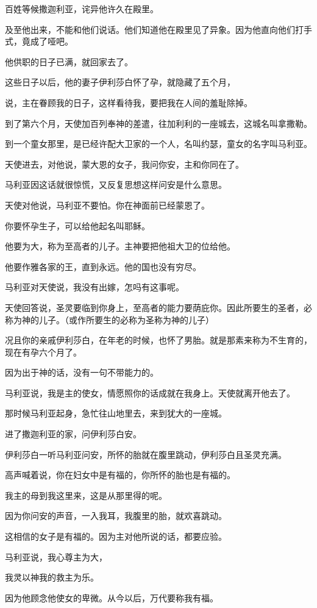 \documentclass[12pt,oneside]{book}
\begin{document}
百姓等候撒迦利亚，诧异他许久在殿里。

及至他出来，不能和他们说话。他们知道他在殿里见了异象。因为他直向他们打手式，竟成了哑吧。

他供职的日子已满，就回家去了。

这些日子以后，他的妻子伊利莎白怀了孕，就隐藏了五个月，

说，主在眷顾我的日子，这样看待我，要把我在人间的羞耻除掉。

到了第六个月，天使加百列奉神的差遣，往加利利的一座城去，这城名叫拿撒勒。

到一个童女那里，是已经许配大卫家的一个人，名叫约瑟，童女的名字叫马利亚。

天使进去，对他说，蒙大恩的女子，我问你安，主和你同在了。

马利亚因这话就很惊慌，又反复思想这样问安是什么意思。

天使对他说，马利亚不要怕。你在神面前已经蒙恩了。

你要怀孕生子，可以给他起名叫耶稣。

他要为大，称为至高者的儿子。主神要把他祖大卫的位给他。

他要作雅各家的王，直到永远。他的国也没有穷尽。

马利亚对天使说，我没有出嫁，怎吗有这事呢。

天使回答说，圣灵要临到你身上，至高者的能力要荫庇你。因此所要生的圣者，必称为神的儿子。（或作所要生的必称为圣称为神的儿子）

况且你的亲戚伊利莎白，在年老的时候，也怀了男胎。就是那素来称为不生育的，现在有孕六个月了。

因为出于神的话，没有一句不带能力的。

马利亚说，我是主的使女，情愿照你的话成就在我身上。天使就离开他去了。

那时候马利亚起身，急忙往山地里去，来到犹大的一座城。

进了撒迦利亚的家，问伊利莎白安。

伊利莎白一听马利亚问安，所怀的胎就在腹里跳动，伊利莎白且圣灵充满。

高声喊着说，你在妇女中是有福的，你所怀的胎也是有福的。

我主的母到我这里来，这是从那里得的呢。

因为你问安的声音，一入我耳，我腹里的胎，就欢喜跳动。

这相信的女子是有福的。因为主对他所说的话，都要应验。

马利亚说，我心尊主为大，

我灵以神我的救主为乐。

因为他顾念他使女的卑微。从今以后，万代要称我有福。
\end{document}

